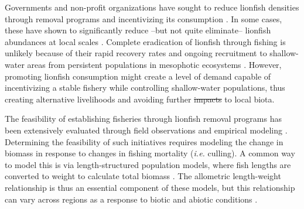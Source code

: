 \documentclass[fleqn,10pt,lineno]{wlpeerj} %
\providecommand{\DIFadd}[1]{{\protect\color{blue}\uwave{#1}}} %
\providecommand{\DIFdel}[1]{{\protect\color{red}\sout{#1}}}                      %
\providecommand{\DIFaddbegin}{} %
\providecommand{\DIFaddend}{} %
\providecommand{\DIFdelbegin}{} %
\providecommand{\DIFdelend}{} %
\begin{document}
Governments and non-profit organizations have sought to reduce lionfish
densities through removal programs and incentivizing its consumption
\citep{chin_2016}. In some cases, these have shown to significantly
reduce --but not quite eliminate-- lionfish abundances at local scales
\citep{deleon_2013,sandel_2015}. Complete eradication of lionfish
through fishing is unlikely because of their rapid recovery rates and
ongoing recruitment to shallow-water areas from persistent populations
in mesophotic ecosystems \citep{barbour_2011,andradibrown_2017}.
However, promoting lionfish consumption might create a level of demand
capable of incentivizing a stable fishery while controlling
shallow-water populations, thus creating alternative livelihoods and
avoiding further \DIFdelbegin \DIFdel{impacts }\DIFdelend \DIFaddbegin \DIFadd{negative effects }\DIFaddend to local biota.

The feasibility of establishing fisheries through lionfish removal
programs has been extensively evaluated through field observations and
empirical modeling
\citep{barbour_2011,morris_2011,deleon_2013,johnston_2015,sandel_2015,usseglio_2017}.
Determining the feasibility of such initiatives requires modeling the
change in biomass in response to changes in fishing mortality
(\emph{i.e.} culling). A common way to model this is via
length-structured population models, where fish lengths are converted to
weight to calculate total biomass
\citep{barbour_2011,cote_2014,andradibrown_2017}. The allometric
length-weight relationship is thus an essential component of these
models, but this relationship can vary across regions as a response to
biotic and abiotic conditions \citep{johnson_2016}.
\end{document}
